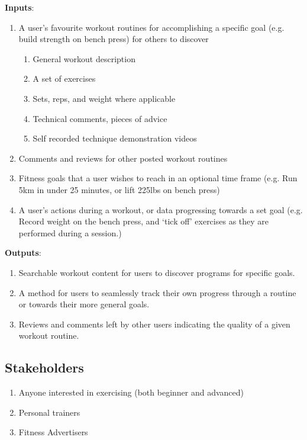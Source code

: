 \documentclass{article}
\begin{document}
\textbf{Inputs}: 
\begin{enumerate}
	\item A user's favourite workout routines for accomplishing a specific goal (e.g. build strength on bench press) for others to discover
	\begin{enumerate}
		\item General workout description
		\item A set of exercises
		\item Sets, reps, and weight where applicable
		\item Technical comments, pieces of advice
		\item Self recorded technique demonstration videos
	\end{enumerate}
	\item Comments and reviews for other posted workout routines
	\item Fitness goals that a user wishes to reach in an optional time frame (e.g. Run 5km in under 25 minutes, or lift 225lbs on bench press)
	\item A user's actions during a workout, or data progressing towards a set goal (e.g. Record weight on the bench press, and `tick off' exercises as they are performed during a session.)
\end{enumerate}

\textbf{Outputs}:
\begin{enumerate}
	\item Searchable workout content for users to discover programs for specific goals.
	\item A method for users to seamlessly track their own progress through a routine or towards their more general goals.
	\item Reviews and comments left by other users indicating the quality of a given workout routine.
\end{enumerate}


\subsection{Stakeholders}
\begin{enumerate}
	\item Anyone interested in exercising (both beginner and advanced)
	\item Personal trainers
	\item Fitness Advertisers
\end{enumerate}
\end{document}
